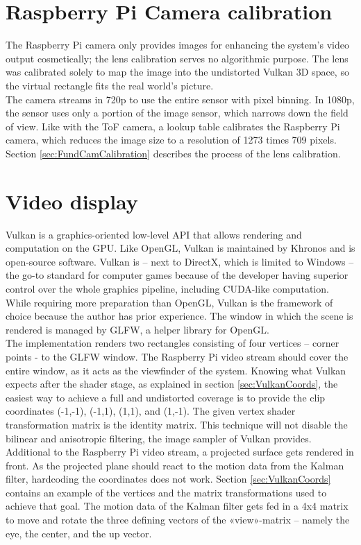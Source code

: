 \section{Raspberry Pi Camera calibration}
\label{sec:RBPiCalibration}
The Raspberry Pi camera only provides images for enhancing the system's video output cosmetically; the lens calibration serves no algorithmic purpose. The lens was calibrated solely to map the image into the undistorted Vulkan 3D space, so the virtual rectangle fits the real world's picture.\\
The camera streams in 720p to use the entire sensor with pixel binning. In 1080p, the sensor uses only a portion of the image sensor, which narrows down the field of view. Like with the ToF camera, a lookup table calibrates the Raspberry Pi camera, which reduces the image size to a resolution of 1273 times 709 pixels. Section \ref{sec:FundCamCalibration} describes the process of the lens calibration.

\section{Video display}
\label{sec:VideoDisplay}
Vulkan is a graphics-oriented low-level API that allows rendering and computation on the GPU. Like OpenGL, Vulkan is maintained by Khronos and is open-source software. Vulkan is – next to DirectX, which is limited to Windows – the go-to standard for computer games because of the developer having superior control over the whole graphics pipeline, including CUDA-like computation. While requiring more preparation than OpenGL, Vulkan is the framework of choice because the author has prior experience. The window in which the scene is rendered is managed by GLFW, a helper library for OpenGL.\\
The implementation renders two rectangles consisting of four vertices – corner points -  to the GLFW window. The Raspberry Pi video stream should cover the entire window, as it acts as the viewfinder of the system. Knowing what Vulkan expects after the shader stage, as explained in section \ref{sec:VulkanCoords}, the easiest way to achieve a full and undistorted coverage is to provide the clip coordinates (-1,-1), (-1,1), (1,1), and (1,-1). The given vertex shader transformation matrix is the identity matrix. This technique will not disable the bilinear and anisotropic filtering, the image sampler of Vulkan provides.\\
Additional to the Raspberry Pi video stream, a projected surface gets rendered in front. As the projected plane should react to the motion data from the Kalman filter, hardcoding the coordinates does not work. Section \ref{sec:VulkanCoords} contains an example of the vertices and the matrix transformations used to achieve that goal. The motion data of the Kalman filter gets fed in a 4x4 matrix to move and rotate the three defining vectors of the «view»-matrix – namely the eye, the center, and the up vector.
